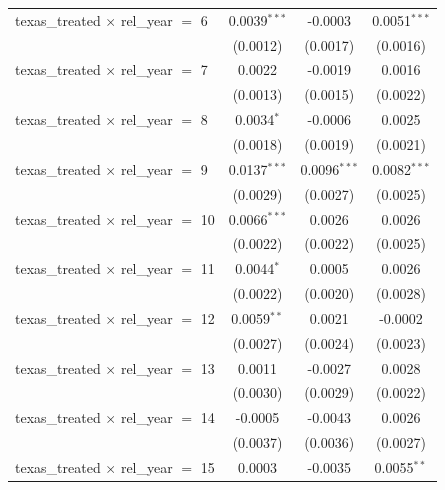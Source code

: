 \begin{tabular}{lccc}
   texas\_treated $\times$ rel\_year $=$ 6      & 0.0039$^{***}$  & -0.0003         & 0.0051$^{***}$\\   
                                                & (0.0012)        & (0.0017)        & (0.0016)\\   
   texas\_treated $\times$ rel\_year $=$ 7      & 0.0022          & -0.0019         & 0.0016\\   
                                                & (0.0013)        & (0.0015)        & (0.0022)\\   
   texas\_treated $\times$ rel\_year $=$ 8      & 0.0034$^{*}$    & -0.0006         & 0.0025\\   
                                                & (0.0018)        & (0.0019)        & (0.0021)\\   
   texas\_treated $\times$ rel\_year $=$ 9      & 0.0137$^{***}$  & 0.0096$^{***}$  & 0.0082$^{***}$\\   
                                                & (0.0029)        & (0.0027)        & (0.0025)\\   
   texas\_treated $\times$ rel\_year $=$ 10     & 0.0066$^{***}$  & 0.0026          & 0.0026\\   
                                                & (0.0022)        & (0.0022)        & (0.0025)\\   
   texas\_treated $\times$ rel\_year $=$ 11     & 0.0044$^{*}$    & 0.0005          & 0.0026\\   
                                                & (0.0022)        & (0.0020)        & (0.0028)\\   
   texas\_treated $\times$ rel\_year $=$ 12     & 0.0059$^{**}$   & 0.0021          & -0.0002\\   
                                                & (0.0027)        & (0.0024)        & (0.0023)\\   
   texas\_treated $\times$ rel\_year $=$ 13     & 0.0011          & -0.0027         & 0.0028\\   
                                                & (0.0030)        & (0.0029)        & (0.0022)\\   
   texas\_treated $\times$ rel\_year $=$ 14     & -0.0005         & -0.0043         & 0.0026\\   
                                                & (0.0037)        & (0.0036)        & (0.0027)\\   
   texas\_treated $\times$ rel\_year $=$ 15     & 0.0003          & -0.0035         & 0.0055$^{**}$\\   

\end{tabular}

